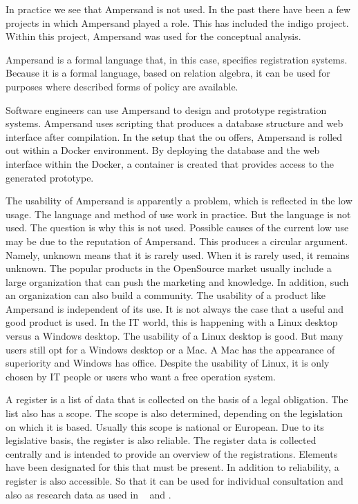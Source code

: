 In practice we see that Ampersand is not used.
In the past there have been a few projects in which Ampersand played a role.
This has included the \acrlong{indigo} project.
Within this project, Ampersand was used for the conceptual analysis.

Ampersand is a formal language that, in this case, specifies registration systems.
Because it is a formal language, based on relation algebra, it can be used for purposes where described forms of policy are available.

Software engineers can use Ampersand to design and prototype registration systems.
Ampersand uses scripting that produces a database structure and web interface after compilation.
In the setup that the \acrlong{ou} offers, Ampersand is rolled out within a Docker environment.
By deploying the database and the web interface within the Docker, a container is created that provides access to the generated prototype.

The usability of Ampersand is apparently a problem, which is reflected in the low usage.
The language and method of use work in practice.
But the language is not used.
The question is why this is not used.
Possible causes of the current low use may be due to the reputation of Ampersand.
This produces a circular argument.
Namely, unknown means that it is rarely used.
When it is rarely used, it remains unknown.
The popular products in the OpenSource market usually include a large organization that can push the marketing and knowledge.
In addition, such an organization can also build a community.
The usability of a product like Ampersand is independent of its use.
It is not always the case that a useful and good product is used.
In the IT world, this is happening with a Linux desktop versus a Windows desktop.
The usability of a Linux desktop is good.
But many users still opt for a Windows desktop or a Mac.
A Mac has the appearance of superiority and Windows has office.
Despite the usability of Linux, it is only chosen by IT people or users who want a free operation system.

A register is a list of data that is collected on the basis of a legal obligation.
The list also has a scope.
The scope is also determined, depending on the legislation on which it is based.
Usually this scope is national or European.
Due to its legislative basis, the register is also reliable.
The register data is collected centrally and is intended to provide an overview of the registrations.
Elements have been designated for this that must be present.
In addition to reliability, a register is also accessible.
So that it can be used for individual consultation and also as research data as used in ~\cite{schmidt_danish_2015} and \cite{bakken_norwegian_2019}.

